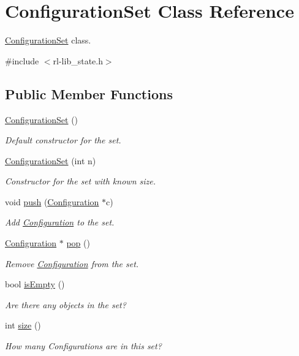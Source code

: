 \hypertarget{classConfigurationSet}{\section{Configuration\-Set Class Reference}
\label{classConfigurationSet}
}


\hyperlink{classConfigurationSet}{Configuration\-Set} class.  




{\ttfamily \#include $<$rl-\/lib\-\_\-state.\-h$>$}

\subsection*{Public Member Functions}
\begin{DoxyCompactItemize}
\item 
\hyperlink{classConfigurationSet_a999e0eafae43cc9eac9b2ece1a808d1c}{Configuration\-Set} ()
\begin{DoxyCompactList}\small\item\em Default constructor for the set. \end{DoxyCompactList}\item 
\hyperlink{classConfigurationSet_aa30585ab5b48d3aec5219d8ecf6decec}{Configuration\-Set} (int n)
\begin{DoxyCompactList}\small\item\em Constructor for the set with known size. \end{DoxyCompactList}\item 
void \hyperlink{classConfigurationSet_a964dd92bef46df4e2b6f8c93ed776e99}{push} (\hyperlink{classConfiguration}{Configuration} $\ast$c)
\begin{DoxyCompactList}\small\item\em Add \hyperlink{classConfiguration}{Configuration} to the set. \end{DoxyCompactList}\item 
\hyperlink{classConfiguration}{Configuration} $\ast$ \hyperlink{classConfigurationSet_a85f2cc23e93e3736edadce7a541b200c}{pop} ()
\begin{DoxyCompactList}\small\item\em Remove \hyperlink{classConfiguration}{Configuration} from the set. \end{DoxyCompactList}\item 
bool \hyperlink{classConfigurationSet_a31e520d14bff315040b43b0da7d050fe}{is\-Empty} ()
\begin{DoxyCompactList}\small\item\em Are there any objects in the set? \end{DoxyCompactList}\item 
int \hyperlink{classConfigurationSet_a0fdde488f125fc12bf8267c39d8bf9c2}{size} ()
\begin{DoxyCompactList}\small\item\em How many Configurations are in this set? \end{DoxyCompactList}\end{DoxyCompactItemize}


